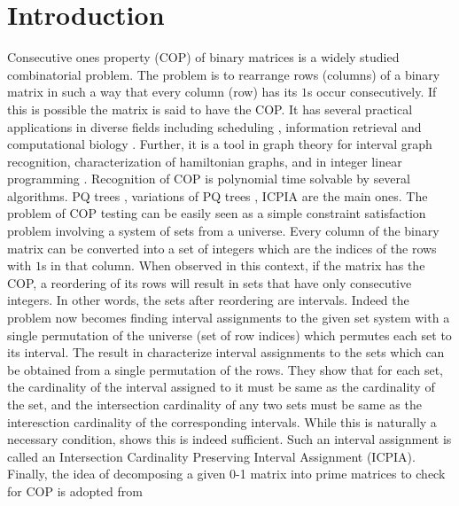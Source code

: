 \documentclass{fsttcs}
\newcommand{\rcomment}[1]{}
\begin{document}
\section{Introduction}
  \rcomment{Needs a section overhaul }
\noindent
Consecutive ones property (COP) of binary matrices is a widely studied
combinatorial problem. The problem is to rearrange rows (columns) of a
binary matrix in such a way that every column (row) has its $1$s occur
consecutively. If this is possible the matrix is said to have the COP.  It
has several practical applications in diverse fields including
scheduling \cite{hl06}, information retrieval \cite{k77} and
computational biology \cite{abh98}.  Further, it is a tool in graph
theory \cite{mcg04} for interval graph recognition, characterization of
hamiltonian graphs, and in integer linear programming \cite{ht02, hl06}.
Recognition of COP is polynomial time solvable by several
algorithms. PQ trees \cite{bl76}, variations of PQ
trees \cite{mm09, wlh01, wlh02, mcc04}, ICPIA \cite{nsnrs09} are the main
ones.
\noindent
The problem of COP testing can be easily seen as a simple constraint
satisfaction problem involving a system of sets from a universe. Every
column of the binary matrix can be converted into a set of integers
which are the indices of the rows with $1$s in that column. When
observed in this context, if the matrix has the COP, a reordering of its
rows will result in sets that have only consecutive integers. In other
words, the sets after reordering are intervals. Indeed the problem now
becomes finding 
interval assignments to the given set system \cite{nsnrs09} with a
single permutation of the universe (set of row indices) which permutes each
set to its interval. The result in \cite{nsnrs09} characterize
interval assignments to the sets which can be obtained from a single
permutation of the rows.  They show that for each set, the cardinality
of the interval assigned to it must be same as the cardinality of the set,
and the intersection cardinality of any two sets must be same as the
interesction cardinality of the corresponding intervals.  While this
is naturally a necessary condition, \cite{nsnrs09} shows this is indeed
sufficient.  Such an interval assignment is called an Intersection
Cardinality Preserving Interval Assignment (ICPIA).  Finally, the idea of
decomposing a given 0-1 matrix into prime matrices to check for COP is
adopted from 
\end{document}
